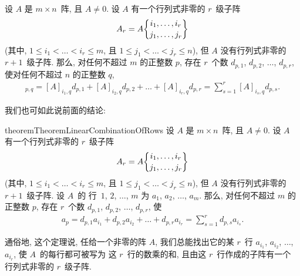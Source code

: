 \documentclass[../libro.tex]{subfiles}
\begin{document}
\begin{theorem}
    设 \(A\) 是 \(m \times n\)~阵,
    且 \(A \neq 0\).
    设 \(A\) 有一个行列式非零的 \(r\)~级子阵
    \begin{align*}
        A_r = A\submat{i_1,\dots,i_r}{j_1,\dots,j_r}
    \end{align*}
    (其中, %
    \(1 \leq i_1 < \dots < i_r \leq m\),
    且 \(1 \leq j_1 < \dots < j_r \leq n\)), %
    但 \(A\) 没有行列式非零的 \(r+1\)~级子阵.
    那么, 对任何不超过 \(m\) 的正整数 \(p\),
    存在 \(r\)~个数
    \(d_{p,1}\), \(d_{p,2}\), \(\dots\), \(d_{p,r}\),
    使对任何不超过 \(n\) 的正整数 \(q\),
    \begin{align*}
        [A]_{p,q}
        = [A]_{i_1,q} d_{p,1}
        + [A]_{i_2,q} d_{p,2}
        + \dots
        + [A]_{i_r,q} d_{p,r}
        =
        \sum_{s = 1}^{r} {[A]_{i_s,q} d_{p,s}}.
    \end{align*}
\end{theorem}

我们也可如此说前面的结论:

\begin{restatable}{theorem}{TheoremLinearCombinationOfRows}
    设 \(A\) 是 \(m \times n\)~阵,
    且 \(A \neq 0\).
    设 \(A\) 有一个行列式非零的 \(r\)~级子阵
    \begin{align*}
        A_r = A\submat{i_1,\dots,i_r}{j_1,\dots,j_r}
    \end{align*}
    (其中, %
    \(1 \leq i_1 < \dots < i_r \leq m\),
    且 \(1 \leq j_1 < \dots < j_r \leq n\)), %
    但 \(A\) 没有行列式非零的 \(r+1\)~级子阵.
    设 \(A\)~的%
    行~\(1\), \(2\), \(\dots\), \(m\)
    为 \(a_1\), \(a_2\), \(\dots\), \(a_m\).
    那么, 对任何不超过 \(m\) 的正整数 \(p\),
    存在 \(r\)~个数
    \(d_{p,1}\), \(d_{p,2}\), \(\dots\), \(d_{p,r}\),
    使
    \begin{align*}
        a_p
        = d_{p,1} a_{i_1}
        + d_{p,2} a_{i_2}
        + \dots
        + d_{p,r} a_{i_r}
        = \sum_{s = 1}^{r} {d_{p,s} a_{i_s}}.
    \end{align*}
\end{restatable}

通俗地, 这个定理说,
任给一个非零的阵 \(A\),
我们总能找出它的某 \(r\)~行
\(a_{i_1}\), \(a_{i_2}\), \(\dots\), \(a_{i_r}\),
使 \(A\)~的每行都可被写为%
这 \(r\)~行的数乘的和,
且由这 \(r\)~行作成的子阵有一个%
行列式非零的 \(r\)~级子阵.
\end{document}
